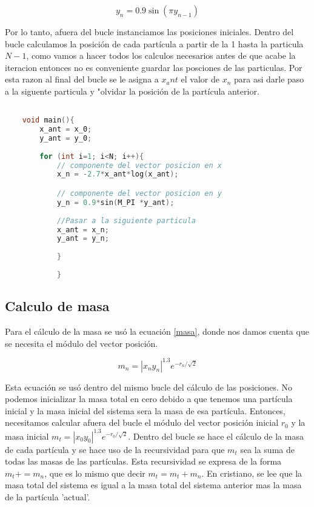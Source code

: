 \documentclass[12pt]{article}
\begin{document}
\begin{equation}
    \label{y_n}
    y_n = 0.9 \sin(\pi y_{n-1})
\end{equation}

Por lo tanto, afuera del bucle instanciamos las posiciones iniciales. Dentro del bucle calculamos la posición de cada partícula a partir de la 1 hasta la particula $N-1$, como vamos a hacer todos los calculos necesarios antes de que acabe la iteracion entonces no es conveniente guardar las posciones de las particulas. Por esta razon al final del bucle se le asigna a $x_ant$ el valor de $x_n$ para asi darle paso a la siguente particula y "olvidar la posición de la partícula anterior.

\begin{lstlisting}[language=C, caption={Calculo de componentes de posición}, style=mystyle]

    void main(){
        x_ant = x_0;
        y_ant = y_0;
                
        for (int i=1; i<N; i++){
            // componente del vector posicion en x
            x_n = -2.7*x_ant*log(x_ant);

            // componente del vector posicion en y
            y_n = 0.9*sin(M_PI *y_ant);        
             
            //Pasar a la siguiente particula
            x_ant = x_n;
            y_ant = y_n;
        
            }       
            
            }

    \end{lstlisting}


\subsection{Calculo de masa}

Para el cálculo de la masa se usó la ecuación \ref{masa}, donde nos damos cuenta que se necesita el módulo del vector posición.

\begin{equation}
    \label{masa}
    m_n = |x_n y_n|^{1.3} e^{-r_n / \sqrt{2}}
\end{equation}

Esta ecuación se usó dentro del mismo bucle del cálculo de las posiciones. No podemos inicializar la masa total en cero debido a que tenemos una partícula inicial y la masa inicial del sistema sera la masa de esa partícula.
Entonces, necesitamos calcular afuera del bucle el módulo del vector posición inicial $r_0$ y la masa inicial $m_t = |x_0 y_0|^{1.3} e^{-r_0 / \sqrt{2}}$. Dentro del bucle se hace el cálculo de la masa de cada partícula y se hace uso de la recursividad para que $m_t$ sea la suma de todas las masas de las partículas. Esta recursividad se expresa de la forma $m_t += m_n$, que es lo mismo que decir $m_t = m_t + m_n$. En cristiano, se lee que la masa total del sistema es igual a la masa total del sistema anterior mas la masa de la partícula 'actual'.\\
\end{document}

